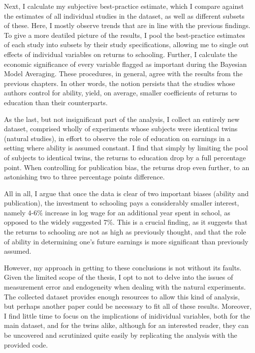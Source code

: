 Next, I calculate my subjective best-practice estimate, which I compare against the estimates of all individual studies in the dataset, as well as different subsets of these. Here, I mostly observe trends that are in line with the previous findings. To give a more deatiled picture of the results, I pool the best-practice estimates of each study into subsets by their study specifications, allowing me to single out effects of individual variables on returns to schooling. Further, I calculate the economic significance of every variable flagged as important during the Bayesian Model Averaging. These procedures, in general, agree with the results from the previous chapters. In other words, the notion persists that the studies whose authors control for ability, yield, on average, smaller coefficients of returns to education than their counterparts.

As the last, but not insignificant part of the analysis, I collect an entirely new dataset, comprised wholly of experiments whose subjects were identical twins (natural studies), in effort to observe the role of education on earnings in a setting where ability is assumed constant. I find that simply by limiting the pool of subjects to identical twins, the returns to education drop by a full percentage point. When controlling for publication bias, the returns drop even further, to an astonishing two to three percentage points difference.

All in all, I argue that once the data is clear of two important biases (ability and publication), the investment to schooling pays a considerably smaller interest, namely 4-6\% increase in log wage for an additional year spent in school, as opposed to the widely suggested 7\%. This is a crucial finding, as it suggests that the returns to schooling are not as high as previously thought, and that the role of ability in determining one's future earnings is more significant than previously assumed.

However, my approach in getting to these conclusions is not without its faults. Given the limited scope of the thesis, I opt to not to delve into the issues of measurement error and endogeneity when dealing with the natural experiments. The collected dataset provides enough resources to allow this kind of analysis, but perhaps another paper could be necessary to fit all of these results. Moreover, I find little time to focus on the implications of inidividual variables, both for the main dataset, and for the twins alike, although for an interested reader, they can be uncovered and scrutinized quite easily by replicating the analysis with the provided code.

